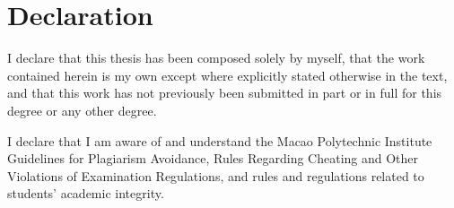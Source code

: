 \chapter*{Declaration}
\thispagestyle{empty}

I declare that this thesis has been composed solely by myself, that the work contained herein is my own except where explicitly stated otherwise in the text, and that this work has not previously been submitted in part or in full for this degree or any other degree.

I declare that I am aware of and understand the Macao Polytechnic Institute Guidelines for Plagiarism Avoidance, Rules Regarding Cheating and Other Violations of Examination Regulations, and rules and regulations related to students' academic integrity.